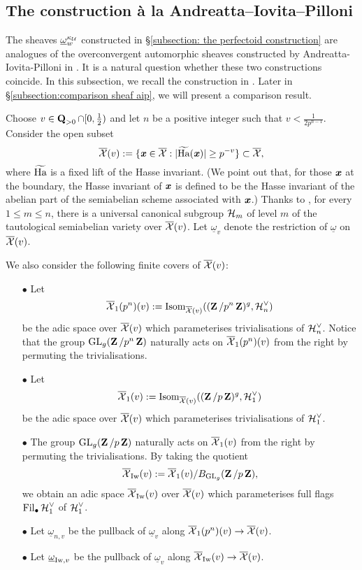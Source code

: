 \subsection{The construction \`{a} la Andreatta--Iovita--Pilloni}\label{subsection: construction of AIP}
The sheaves $\underline{\omega}^{\kappa_{\operatorname{\mathcal{U}}}}_w$ constructed in \S \ref{subsection: the perfectoid construction} are analogues of the overconvergent automorphic sheaves constructed by Andreatta-Iovita-Pilloni in \cite{AIP-2015}. It is a natural question whether these two constructions coincide. In this subsection, we recall the construction in \cite{AIP-2015}. Later in \S \ref{subsection:comparison sheaf aip}, we will present a comparison result.

Choose $v\in \operatorname{\mathbf{Q}}_{>0}\cap [0,\frac{1}{2})$ and let $n$ be a positive integer such that $v<\frac{1}{2p^{n-1}}$. Consider the open subset $$\overline{\operatorname{\mathcal{X}}}(v):=\{\operatorname{\textbf{\textit{x}}}\in \overline{\operatorname{\mathcal{X}}}: |\widetilde{\operatorname{Ha}}(\operatorname{\textbf{\textit{x}}})|\geq p^{-v}\}\subset \overline{\operatorname{\mathcal{X}}},$$ where $\widetilde{\operatorname{Ha}}$ is a fixed lift of the Hasse invariant. (We point out that, for those $\operatorname{\textbf{\textit{x}}}$ at the boundary,  the Hasse invariant of $\operatorname{\textbf{\textit{x}}}$ is defined to be the Hasse invariant of the abelian part of the semiabelian scheme associated with $\operatorname{\textbf{\textit{x}}}$.) Thanks to \cite[Proposition 4.1.3]{AIP-2015}, for every $1\leq m\leq n$, there is a universal canonical subgroup $\operatorname{\mathcal{H}}_m$ of level $m$ of the tautological semiabelian variety over $\overline{\operatorname{\mathcal{X}}}(v)$. Let $\underline{\omega}_v$ denote the restriction of $\underline{\omega}$ on $\overline{\operatorname{\mathcal{X}}}(v)$.

We also consider the following finite covers of $\overline{\operatorname{\mathcal{X}}}(v)$:
\begin{enumerate}
\item[$\bullet$] Let $$\overline{\operatorname{\mathcal{X}}}_1(p^n)(v):=\operatorname{Isom}_{\overline{\operatorname{\mathcal{X}}}(v)}((\operatorname{\mathbf{Z}}/p^n\operatorname{\mathbf{Z}})^g, \operatorname{\mathcal{H}}_n^{\vee})$$ be the adic space over $\overline{\operatorname{\mathcal{X}}}(v)$ which parameterises trivialisations of $\operatorname{\mathcal{H}}_n^{\vee}$. Notice that the group $\operatorname{GL}_g(\operatorname{\mathbf{Z}}/p^n\operatorname{\mathbf{Z}})$ naturally acts on $\overline{\operatorname{\mathcal{X}}}_1(p^n)(v)$ from the right by permuting the trivialisations. 
\item[$\bullet$] Let $$\overline{\operatorname{\mathcal{X}}}_1(v):=\operatorname{Isom}_{\overline{\operatorname{\mathcal{X}}}(v)}((\operatorname{\mathbf{Z}}/p\operatorname{\mathbf{Z}})^g, \operatorname{\mathcal{H}}_1^{\vee})$$ be the adic space over $\overline{\operatorname{\mathcal{X}}}(v)$ which parameterises trivialisations of $\operatorname{\mathcal{H}}_1^{\vee}$. 
\item[$\bullet$] The group $\operatorname{GL}_g(\operatorname{\mathbf{Z}}/p\operatorname{\mathbf{Z}})$ naturally acts on $\overline{\operatorname{\mathcal{X}}}_1(v)$ from the right by permuting the trivialisations. By taking the quotient
$$\overline{\operatorname{\mathcal{X}}}_{\operatorname{Iw}}(v):=\overline{\operatorname{\mathcal{X}}}_1(v)/B_{\operatorname{GL}_g}(\operatorname{\mathbf{Z}}/p\operatorname{\mathbf{Z}}),$$ we obtain an adic space $\overline{\operatorname{\mathcal{X}}}_{\operatorname{Iw}}(v)$ over $\overline{\operatorname{\mathcal{X}}}(v)$ which parameterises full flags $\operatorname{Fil}_{\bullet}\operatorname{\mathcal{H}}_1^{\vee}$ of $\operatorname{\mathcal{H}}_1^{\vee}$.
\item[$\bullet$] Let $\underline{\omega}_{n,v}$ be the pullback of $\underline{\omega}_v$ along $\overline{\operatorname{\mathcal{X}}}_1(p^n)(v)\rightarrow \overline{\operatorname{\mathcal{X}}}(v)$. 
\item[$\bullet$] Let $\underline{\omega}_{\operatorname{Iw},v}$ be the pullback of $\underline{\omega}_v$ along $\overline{\operatorname{\mathcal{X}}}_{\operatorname{Iw}}(v)\rightarrow \overline{\operatorname{\mathcal{X}}}(v)$.
\end{enumerate}


